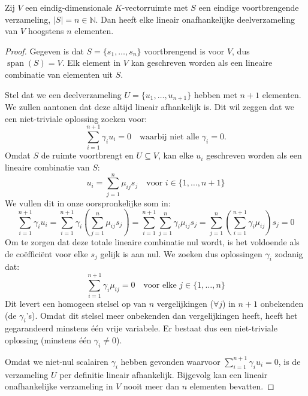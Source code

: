 \begin{lemma}
    Zij $V$ een eindig-dimensionale $K$-vectorruimte met $S$ een eindige voortbrengende verzameling, $|S| = n \in \mathbb{N}$. Dan heeft elke lineair onafhankelijke deelverzameling van $V$ hoogstens $n$ elementen.
\end{lemma}
\begin{proof}
    Gegeven is dat $S = \{s_1, \dots, s_n\}$ voortbrengend is voor $V$, dus $\operatorname{span}(S) = V$. Elk element in $V$ kan geschreven worden als een lineaire combinatie van elementen uit $S$.

    Stel dat we een deelverzameling $U = \{u_1, \dots , u_{n+1}\}$ hebben met $n+1$ elementen. We zullen aantonen dat deze altijd lineair afhankelijk is.
    Dit wil zeggen dat we een niet-triviale oplossing zoeken voor:
    \[
    \sum_{i=1}^{n+1} \gamma_i u_i = 0 \quad \text{waarbij niet alle } \gamma_i = 0.
    \]
    Omdat $S$ de ruimte voortbrengt en $U \subseteq V$, kan elke $u_i$ geschreven worden als een lineaire combinatie van $S$:
    \[
    u_i = \sum_{j=1}^{n} \mu_{ij} s_j \quad \text{voor } i \in \{1, \dots, n+1\}
    \]
    We vullen dit in onze oorspronkelijke som in:
    \[
        \sum_{i=1}^{n+1} \gamma_i u_i
        = \sum_{i=1}^{n+1} \gamma_i \left( \sum_{j=1}^{n} \mu_{ij} s_j \right)
        = \sum_{i=1}^{n+1} \sum_{j=1}^{n} \gamma_i \mu_{ij} s_j
        = \sum_{j=1}^{n} \left( \sum_{i=1}^{n+1} \gamma_i \mu_{ij} \right) s_j = 0
    \]
    Om te zorgen dat deze totale lineaire combinatie nul wordt,
    is het voldoende als de coëfficiënt voor elke $s_j$ gelijk is aan nul.
    We zoeken dus oplossingen $\gamma_i$ zodanig dat:
    \[ \sum_{i=1}^{n+1} \gamma_i \mu_{ij} = 0 \quad \text{voor elke } j \in \{1, \dots, n\} \]
    Dit levert een homogeen stelsel op van $n$ vergelijkingen ($\forall j$) in $n+1$ onbekenden (de $\gamma_i$'s).
    Omdat dit stelsel meer onbekenden dan vergelijkingen heeft,
    heeft het gegarandeerd minstens één vrije variabele.
    Er bestaat dus een niet-triviale oplossing (minstens één $\gamma_i \neq 0$).

    Omdat we niet-nul scalairen $\gamma_i$ hebben gevonden waarvoor $\sum_{i=1}^{n+1} \gamma_i u_i = 0$,
    is de verzameling $U$ per definitie lineair afhankelijk.
    Bijgevolg kan een lineair onafhankelijke verzameling in $V$ nooit meer dan $n$ elementen bevatten.
\end{proof}

